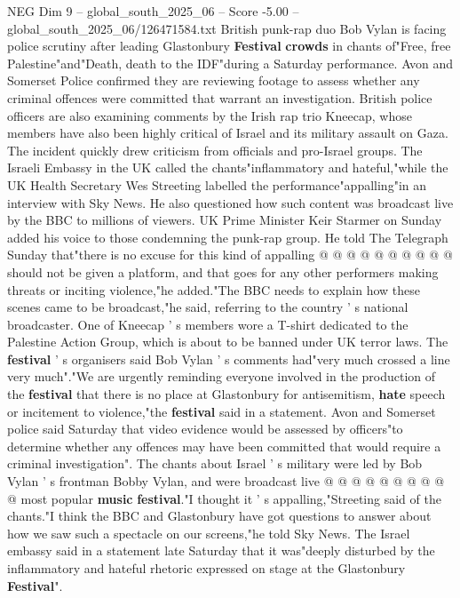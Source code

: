 \begin{textsample}{NEG Dim 9 – global\_south\_2025\_06 – Score -5.00 – global\_south\_2025\_06/126471584.txt}  \label{ex:f9_neg_254}
British punk-rap duo Bob Vylan is facing police scrutiny after leading Glastonbury \textbf{Festival} \textbf{crowds} in chants of"Free, free Palestine"and"Death, death to the IDF"during a Saturday performance.
Avon and Somerset Police confirmed they are reviewing footage to assess whether any criminal offences were committed that warrant an investigation.
British police officers are also examining comments by the Irish rap trio Kneecap, whose members have also been highly critical of Israel and its military assault on Gaza.
The incident quickly drew criticism from officials and pro-Israel groups.
The Israeli Embassy in the UK called the chants"inflammatory and hateful,"while the UK Health Secretary Wes Streeting labelled the performance"appalling"in an interview with Sky News.
He also questioned how such content was broadcast live by the BBC to millions of viewers.
UK Prime Minister Keir Starmer on Sunday added his voice to those condemning the punk-rap group.
He told The Telegraph Sunday that"there is no excuse for this kind of appalling @ @ @ @ @ @ @ @ @ @ should not be given a platform, and that goes for any other performers making threats or inciting violence,"he added."The BBC needs to explain how these scenes came to be broadcast,"he said, referring to the country ' s national broadcaster.
One of Kneecap ' s members wore a T-shirt dedicated to the Palestine Action Group, which is about to be banned under UK terror laws.
The \textbf{festival} ' s organisers said Bob Vylan ' s comments had"very much crossed a line very much"."We are urgently reminding everyone involved in the production of the \textbf{festival} that there is no place at Glastonbury for antisemitism, \textbf{hate} speech or incitement to violence,"the \textbf{festival} said in a statement.
Avon and Somerset police said Saturday that video evidence would be assessed by officers"to determine whether any offences may have been committed that would require a criminal investigation".
The chants about Israel ' s military were led by Bob Vylan ' s frontman Bobby Vylan, and were broadcast live @ @ @ @ @ @ @ @ @ @ most popular \textbf{music} \textbf{festival}."I thought it ' s appalling,"Streeting said of the chants."I think the BBC and Glastonbury have got questions to answer about how we saw such a spectacle on our screens,"he told Sky News.
The Israel embassy said in a statement late Saturday that it was"deeply disturbed by the inflammatory and hateful rhetoric expressed on stage at the Glastonbury \textbf{Festival}".

\end{textsample}
